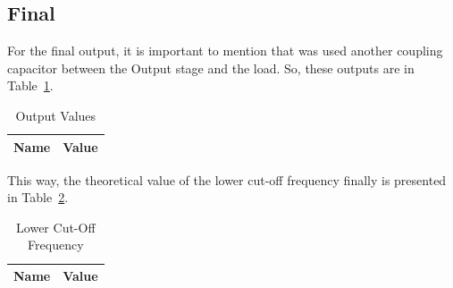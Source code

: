 \subsection{Final}
For the final output, it is important to mention that was used another coupling capacitor between the Output stage and the load.
So, these outputs are in Table~\ref{tab:finaltab}.

\begin{table}[H]
  \centering
  \begin{tabular}{|l|r|}
     \hline    
    {\bf Name} & {\bf Value} \\ \hline   
    
  \end{tabular}
  \caption{Output Values}
  \label{tab:finaltab}
\end{table}

This way, the theoretical value of the lower cut-off frequency finally is presented in Table~\ref{tab:lc}.

\begin{table}[H]
  \centering
  \begin{tabular}{|l|r|}
     \hline    
    {\bf Name} & {\bf Value} \\ \hline   
    
  \end{tabular}
  \caption{Lower Cut-Off Frequency}
  \label{tab:lc}
\end{table}


